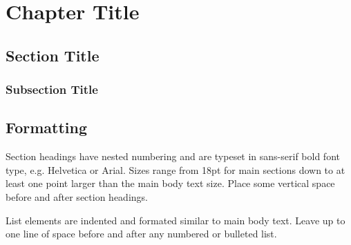 \documentclass[11pt, a4paper,oneside,chapterprefix=false]{scrbook}
\begin{document}


\chapter{Chapter Title} \label{chp:one}


\section{Section Title} \label{sec:one}

\subsection{Subsection Title}


\section{Formatting} \label{sec:format}

Section headings have nested numbering and are typeset in sans-serif bold font type, e.g. Helvetica or Arial.  Sizes range from 18pt for main sections down to at least one point larger than the main body text size. Place some vertical space before and after section headings.

List elements are indented and formated similar to main body text. Leave up to one line of space before and after any numbered or bulleted list.
\end{document}
